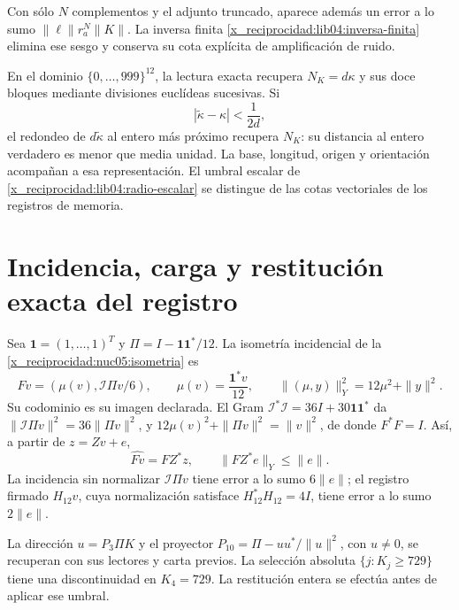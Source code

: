 Con sólo \(N\) complementos y el adjunto truncado, aparece además
un error a lo sumo \(\|\ell\|r_a^N\|K\|\). La inversa finita
\eqref{x_reciprocidad:lib04:inversa-finita} elimina ese sesgo y conserva su cota
explícita de amplificación de ruido.

En el dominio \(\{0,\ldots,999\}^{12}\), la lectura exacta
recupera \(N_K=d\kappa\) y sus doce bloques mediante divisiones
euclídeas sucesivas. Si
\begin{equation}
 |\widetilde\kappa-\kappa|<\frac1{2d},
 \label{x_reciprocidad:lib04:radio-escalar}
\end{equation}
el redondeo de \(d\widetilde\kappa\) al entero más próximo
recupera \(N_K\): su distancia al entero verdadero es menor que
media unidad. La base, longitud, origen y orientación acompañan a
esa representación. El umbral escalar de
\eqref{x_reciprocidad:lib04:radio-escalar} se distingue de las cotas vectoriales
de los registros de memoria.

\section{Incidencia, carga y restitución exacta del registro}
\label{x_reciprocidad:lib04:incidencia}

Sea \(\mathbf1=(1,\ldots,1)^T\) y
\(\Pi=I-\mathbf1\mathbf1^*/12\). La isometría incidencial de
la \cref{x_reciprocidad:nuc05:isometria} es
\begin{equation}
 Fv=(\mu(v),\mathcal I\Pi v/6),\qquad
 \mu(v)=\frac{\mathbf1^*v}{12},\qquad
 \|(\mu,y)\|_Y^2=12\mu^2+\|y\|^2.
 \label{x_reciprocidad:lib04:f-incidencia}
\end{equation}
Su codominio es su imagen declarada. El Gram
\(\mathcal I^*\mathcal I=36I+30\mathbf1\mathbf1^*\) da
\(\|\mathcal I\Pi v\|^2=36\|\Pi v\|^2\), y
\(12\mu(v)^2+\|\Pi v\|^2=\|v\|^2\), de donde \(F^*F=I\).
Así, a partir de \(z=Zv+e\),
\begin{equation}
 \widehat{Fv}=FZ^*z,\qquad \|FZ^*e\|_Y\leq\|e\|.
 \label{x_reciprocidad:lib04:error-incidencia}
\end{equation}
La incidencia sin normalizar \(\mathcal I\Pi v\) tiene error a
lo sumo \(6\|e\|\); el registro firmado \(H_{12}v\), cuya
normalización satisface \(H_{12}^*H_{12}=4I\), tiene error a lo sumo
\(2\|e\|\).

La dirección \(u=P_3\Pi K\) y el proyector
\(P_{10}=\Pi-uu^*/\|u\|^2\), con \(u\neq0\), se recuperan
con sus lectores y carta previos. La selección absoluta
\(\{j:K_j\geq729\}\) tiene una discontinuidad en \(K_4=729\).
La restitución entera se efectúa antes de aplicar ese umbral.

